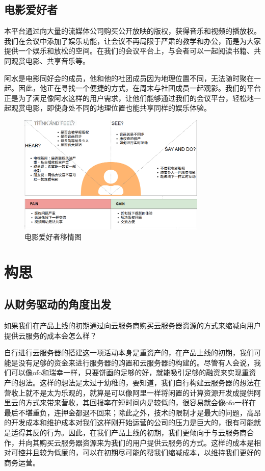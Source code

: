 \documentclass[a4paper,12pt]{article}
\begin{document}
\subsection{电影爱好者}
本平台通过向大量的流媒体公司购买公开放映的版权，获得音乐和视频的播放权。我们在会议中添加了娱乐功能，让会议不再局限于严肃的教学和办公，而是为大家提供一个娱乐和放松的空间。在我们的会议平台上，与会者可以一起阅读书籍、共同观赏电影、共享音乐等。

阿水是电影同好会的成员，他和他的社团成员因为地理位置不同，无法随时聚在一起。因此，他正在寻找一个便捷的方式，在周末与社团成员一起观影。我们的平台正是为了满足像阿水这样的用户需求，让他们能够通过我们的会议平台，轻松地一起观赏电影，即使身处不同的地理位置也能共享同样的娱乐体验。
\begin{figure}[h]
    \centering
    \includegraphics[width=0.8\textwidth]{电影爱好者移情图.png}
    \caption{电影爱好者移情图}
\end{figure}
\clearpage

\section{构思}
\subsection{从财务驱动的角度出发}
如果我们在产品上线的初期通过向云服务商购买云服务器资源的方式来缩减向用户提供云服务的成本会怎么样？

自行进行云服务器的搭建这一项活动本身是重资产的，在产品上线的初期，我们可能是没有足够的资金来进行服务器的购置和云服务器的构建的。尽管有人会说，我们可以像ofo和瑞幸一样，只要饼画的足够的好，就能吸引足够的融资来实现重资产的想法。这样的想法是太过于幼稚的，要知道，我们自行构建云服务器的想法在营收上就不是太为乐观的，就算是可以像阿里一样将闲置的计算资源开发成提供阿里云的方式来带来营收，其回报率在短时间内是较低的，很容易就会像ofo一样在最后不堪重负，连押金都退不回来；除此之外，技术的限制才是最大的问题，高昂的开发成本和维护成本对我们这样刚开始运营的公司的压力是巨大的，很有可能就是适得其反的行为。因此，在我们产品上线的初期，我们更倾向于与云服务商合作，并向其购买云服务器资源来为我们的用户提供云服务的方式。这样的成本是相对可控并且较为低廉的，可以在初期尽可能的帮我们缩减成本，以维持我们更好的商务运营。
\end{document}
